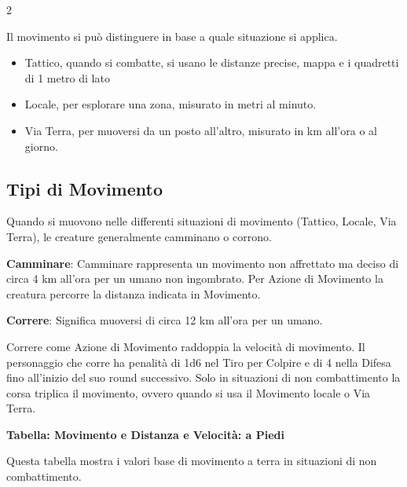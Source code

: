 \begin{multicols}{2}

Il movimento si può distinguere in base a quale situazione si applica.

\medskip

\begin{itemize}[leftmargin=*] \setlength{\itemsep}{0pt}
\item Tattico, quando si combatte, si usano le distanze precise, mappa e i quadretti di 1 metro di lato
\item Locale, per esplorare una zona, misurato in metri al minuto.
\item Via Terra, per muoversi da un posto all'altro, misurato in km all'ora o al giorno.
\end{itemize}

\subsection{Tipi di Movimento}\label{tipodimovimento}\hypertarget{tipodimovimento}{}

Quando si muovono nelle differenti situazioni di movimento (Tattico, Locale, Via Terra), le creature generalmente camminano o corrono.

\textbf{Camminare}: Camminare rappresenta un movimento non affrettato ma deciso di circa 4 km all'ora per un umano non ingombrato. Per Azione di Movimento la creatura percorre la distanza indicata in Movimento.

\textbf{Correre}: Significa muoversi di circa 12 km all'ora per un umano.

Correre come Azione di Movimento raddoppia la velocità di movimento.
Il personaggio che corre ha penalità di 1d6 nel Tiro per Colpire e di 4 nella Difesa fino all'inizio del suo round successivo.
Solo in situazioni di non combattimento la corsa triplica il movimento, ovvero quando si usa il Movimento locale o Via Terra.

\textbf{Tabella: Movimento e Distanza e Velocità: a Piedi} 

Questa tabella mostra i valori base di movimento a terra in situazioni di non combattimento.

\medskip


\end{multicols}

